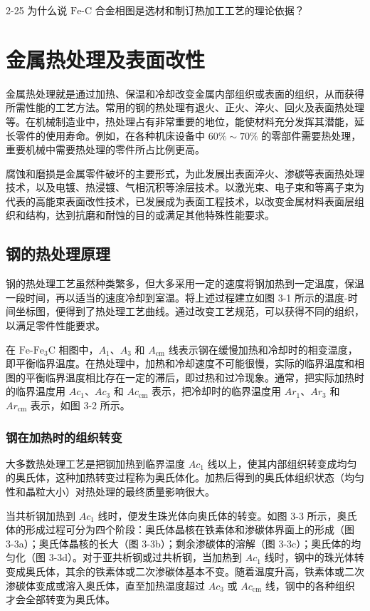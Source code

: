 \documentclass[UTF8]{ctexbook}
\newcommand{\◎}{\ensuremath{\bigcirc}}
\begin{document}
2-25 为什么说 $\text{Fe-C}$ 合金相图是选材和制订热加工工艺的理论依据？


\chapter{金属热处理及表面改性}
金属热处理就是通过加热、保温和冷却改变金属内部组织或表面的组织，从而获得所需性能的工艺方法。常用的钢的热处理有退火、正火、淬火、回火及表面热处理等。在机械制造业中，热处理占有非常重要的地位，能使材料充分发挥其潜能，延长零件的使用寿命。例如，在各种机床设备中 $60\% \sim 70\%$ 的零部件需要热处理，重要机械中需要热处理的零件所占比例更高。

腐蚀和磨损是金属零件破坏的主要形式，为此发展出表面淬火、渗碳等表面热处理技术，以及电镀、热浸镀、气相沉积等涂层技术。以激光束、电子束和等离子束为代表的高能束表面改性技术，已发展成为表面工程技术，以改变金属材料表面层组织和结构，达到抗磨和耐蚀的目的或满足其他特殊性能要求。

\section{钢的热处理原理}

钢的热处理工艺虽然种类繁多，但大多采用一定的速度将钢加热到一定温度，保温一段时间，再以适当的速度冷却到室温。将上述过程建立如图 3-1 所示的温度-时间坐标图，便得到了热处理工艺曲线。通过改变工艺规范，可以获得不同的组织，以满足零件性能要求。

在 $\text{Fe-Fe}_3\text{C}$ 相图中，$A_1$、$A_3$ 和 $A_{\text{cm}}$ 线表示钢在缓慢加热和冷却时的相变温度，即平衡临界温度。在热处理中，加热和冷却速度不可能很慢，实际的临界温度和相图的平衡临界温度相比存在一定的滞后，即过热和过冷现象。通常，把实际加热时的临界温度用 $Ac_1$、$Ac_3$ 和 $Ac_{\text{cm}}$ 表示，把冷却时的临界温度用 $Ar_1$、$Ar_3$ 和 $Ar_{\text{cm}}$ 表示，如图 3-2 所示。

\subsection{钢在加热时的组织转变}
大多数热处理工艺是把钢加热到临界温度 $Ac_1$ 线以上，使其内部组织转变成均匀的奥氏体，这种加热转变过程称为奥氏体化。加热后得到的奥氏体组织状态（均匀性和晶粒大小）对热处理的最终质量影响很大。

当共析钢加热到 $Ac_1$ 线时，便发生珠光体向奥氏体的转变。如图 3-3 所示，奥氏体的形成过程可分为四个阶段：奥氏体晶核在铁素体和渗碳体界面上的形成（图 3-3a）；奥氏体晶核的长大（图 3-3b）；剩余渗碳体的溶解（图 3-3c）；奥氏体的均匀化（图 3-3d）。对于亚共析钢或过共析钢，当加热到 $Ac_1$ 线时，钢中的珠光体转变成奥氏体，其余的铁素体或二次渗碳体基本不变。随着温度升高，铁素体或二次渗碳体变成或溶入奥氏体，直至加热温度超过 $Ac_3$ 或 $Ac_{\text{cm}}$ 线，钢中的各种组织才会全部转变为奥氏体。
\end{document}
